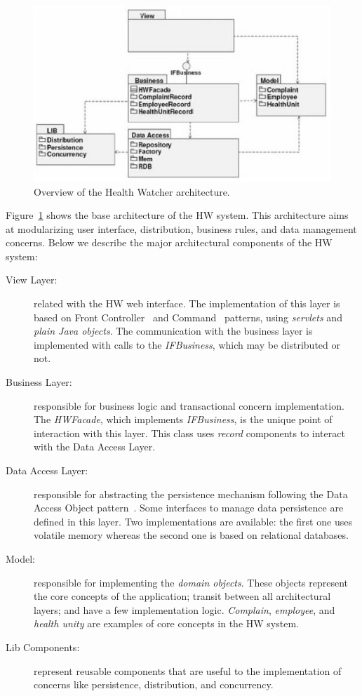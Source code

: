 \begin{figure}[t]
\centering
\includegraphics[scale=0.5]{images/hw.eps}
\caption{Overview of the Health Watcher architecture.}
\label{fig:hw-architecture}
\end{figure}

Figure~\ref{fig:hw-architecture} shows the base architecture of the
HW system. This architecture aims at modularizing user interface,
distribution, business rules, and data management concerns. Below
we describe the major architectural components of the HW system:

\begin{description}

\item [View Layer:] related with the HW web interface. The
implementation of this layer is based on Front
Controller~\cite{alur-book-2003} and
Command~\cite{gamma-dpbook-1995} patterns, using \emph{servlets}
and \emph{plain Java objects}. The communication with the business layer
is implemented with calls to the \emph{IFBusiness}, which may be
distributed or not.

\item [Business Layer:] responsible for business
logic and transactional concern implementation. The
\emph{HWFacade}, which implements \emph{IFBusiness}, is the unique
point of interaction with this layer. This class uses
\emph{record} components to interact with the Data Access Layer.

\item [Data Access Layer:] responsible for abstracting the persistence
mechanism following the Data Access Object
pattern~\cite{alur-book-2003}. Some interfaces to
manage data persistence are defined in this layer. Two
implementations are available: the first one uses volatile memory
whereas the second one is based on relational databases.

\item [Model:] responsible for implementing the \emph{domain objects}.
These objects represent the core concepts of the application;
transit between all architectural layers; and have a few
implementation logic. \emph{Complain}, \emph{employee}, and \emph{health unity}
are examples of core concepts in the HW system. 

\item [Lib Components:] represent reusable components that are useful
to the implementation of concerns like persistence, distribution,
and concurrency.
\end{description}

